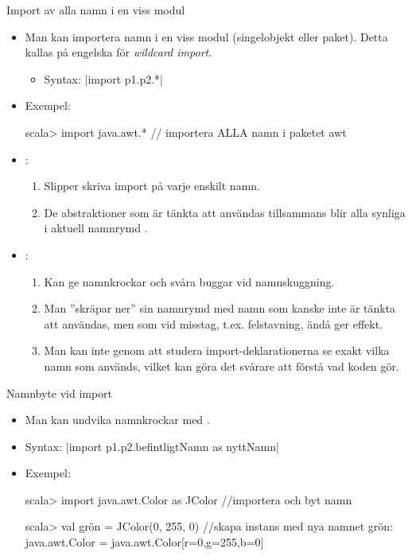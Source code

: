 \begin{Slide}{Import av alla namn i en viss modul}\SlideFontSmall
\begin{itemize}
\item Man kan importera  namn i en viss modul (singelobjekt eller paket). Detta kallas på engelska för \emph{wildcard import}.

\begin{itemize}\SlideFontTiny
  \item Syntax:  \code|import p1.p2.*|
\end{itemize}

\item Exempel:
\begin{REPL}
scala> import java.awt.*  // importera ALLA namn i paketet awt
\end{REPL}
\item {}:
\begin{enumerate}\SlideFontTiny
  \item Slipper skriva import på varje enskilt namn.
  \item De abstraktioner som är tänkta att användas tillsammans blir alla synliga i aktuell namnrymd .
\end{enumerate}
\item {}:
\begin{enumerate}\SlideFontTiny
  \item Kan ge namnkrockar och svåra buggar vid namnskuggning.
  \item Man ''skräpar ner'' sin namnrymd med namn som kanske inte är tänkta att användas, men som vid misstag, t.ex. felstavning, ändå ger effekt.
  \item Man kan inte genom att studera import-deklarationerna se exakt vilka namn som används, vilket kan göra det svårare att förstå vad koden gör.
\end{enumerate}
\end{itemize}
\end{Slide}


\begin{Slide}{Namnbyte vid import}
\begin{itemize}
\item Man kan undvika namnkrockar med .
\item Syntax:  \code|import p1.p2.befintligtNamn as nyttNamn|
\item Exempel:
\begin{REPL}
scala> import java.awt.Color as JColor //importera och byt namn

scala> val grön = JColor(0, 255, 0)  //skapa instans med nya namnet
grön: java.awt.Color = java.awt.Color[r=0,g=255,b=0]
\end{REPL}
\end{itemize}
\end{Slide}

